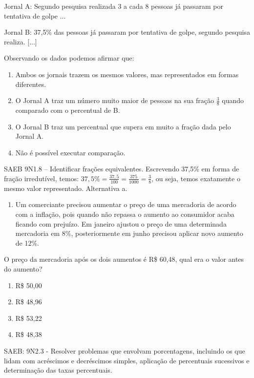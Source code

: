 \begin{escolha}
{{{\begin{escolha}
{{{{{\begin{escolha}
\begin{escolha}
{\begin{q°}
Jornal A: Segundo pesquisa realizada 3 a cada 8 pessoas já passaram por
tentativa de golpe ...

Jornal B: 37,5\% das pessoas já passaram por tentativa de golpe, segundo
pesquisa realiza. {[}...{]}

Observando os dados podemos afirmar que:

\begin{enumerate}

\item
  Ambos os jornais trazem os mesmos valores, mas representados em formas
  diferentes.
\item
  O Jornal A traz um número muito maior de pessoas na sua fração
  \(\frac{3}{8}\) quando comparado com o percentual de B.
\item
  O Jornal B traz um percentual que supera em muito a fração dada pelo
  Jornal A.
\item
  Não é possível executar comparação.
\end{enumerate}

SAEB 9N1.8 -- Identificar frações equivalentes. Escrevendo 37,5\% em
forma de fração irredutível, temos:
\(37,5\% = \frac{37,5}{100} = \frac{375}{1000} = \frac{3}{8}\), ou seja,
temos exatamente o mesmo valor representado. Alternativa a.

\begin{enumerate}
\def\labelenumi{\arabic{enumi}.}
\setcounter{enumi}{3}
\tightlist
\item
  Um comerciante precisou aumentar o preço de uma mercadoria de acordo
  com a inflação, pois quando não repassa o aumento ao consumidor acaba
  ficando com prejuízo. Em janeiro ajustou o preço de uma determinada
  mercadoria em 8\%, posteriormente em junho precisou aplicar novo
  aumento de 12\%.
\end{enumerate}

O preço da mercadoria após os dois aumentos é R\$ 60,48, qual era o
valor antes do aumento?

\begin{enumerate}

\item
  R\$ 50,00
\item
  R\$ 48,96
\item
  R\$ 53,22
\item
  R\$ 48,38
\end{enumerate}

SAEB: 9N2.3 - Resolver problemas que envolvam porcentagens, incluindo os
que lidam com acréscimos e decréscimos simples, aplicação de percentuais
sucessivos e determinação das taxas percentuais.


\end{q°}}
\end{escolha}
\end{escolha}}}}}}
\end{escolha}}}}
\end{escolha}

